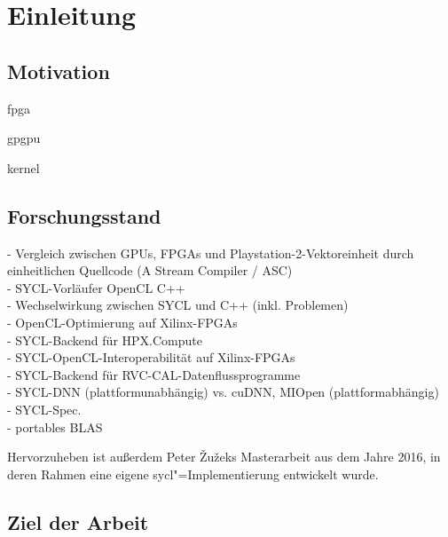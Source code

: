 \chapter{Einleitung}\label{einleitung}

\section{Motivation}\label{einleitung:motivation}

\gls{fpga}

\gls{gpgpu}

\gls{kernel}

\section{Forschungsstand}\label{einleitung:forschung}

\cite{howes2006} - Vergleich zwischen GPUs, FPGAs und Playstation-2-Vektoreinheit durch einheitlichen Quellcode (A Stream Compiler / ASC) \\
\cite{gaster2013} - SYCL-Vorläufer OpenCL C++ \\
\cite{wong2016} - Wechselwirkung zwischen SYCL und C++ (inkl. Problemen) \\
\cite{fifield2016} - OpenCL-Optimierung auf Xilinx-FPGAs \\
\cite{copik2017} - SYCL-Backend für HPX.Compute\\
\cite{doumoulakis2017} - SYCL-OpenCL-Interoperabilität auf Xilinx-FPGAs \\
\cite{krebs2019} - SYCL-Backend für RVC-CAL-Datenflussprogramme \\
\cite{burns2019} - SYCL-DNN (plattformunabhängig) vs. cuDNN, MIOpen (plattformabhängig) \\
\cite{sycl2019} - SYCL-Spec.\\
\cite{rodriguez-gutiez2019} - portables BLAS

Hervorzuheben ist außerdem Peter Žužeks Masterarbeit aus dem Jahre 2016, in
deren Rahmen eine eigene \gls{sycl}"=Implementierung entwickelt wurde. \cite{zuzek2016}

\section{Ziel der Arbeit}\label{einleitung:ziel}
